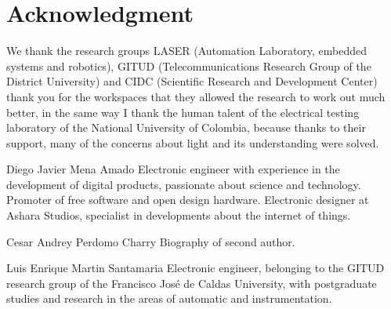 \documentclass[letterpaper,12pt,twoside]{articleingud}
\begin{document}
\section*{Acknowledgment}%
We thank the research groups LASER (Automation Laboratory, embedded systems and robotics), GITUD (Telecommunications Research Group of the District University) and CIDC (Scientific Research and Development Center) thank you for the workspaces that they allowed the research to work out much better, in the same way I thank the human talent of the electrical testing laboratory of the National University of Colombia, because thanks to their support, many of the concerns about light and its understanding were solved.
\begin{biography}%
{Diego Javier Mena Amado}%
Electronic engineer with experience in the development of digital products, passionate about science and technology. Promoter of free software and open design hardware. Electronic designer at Ashara Studios, specialist in developments about the internet of things.
\end{biography}
\begin{biography}%
{Cesar Andrey Perdomo Charry}%
Biography of second author.
\end{biography}
\begin{biography}%
{Luis Enrique Martin Santamaria}%
Electronic engineer, belonging to the GITUD research group of the Francisco José de Caldas University, with postgraduate studies and research in the areas of automatic and instrumentation.
\end{biography}
\end{document}
